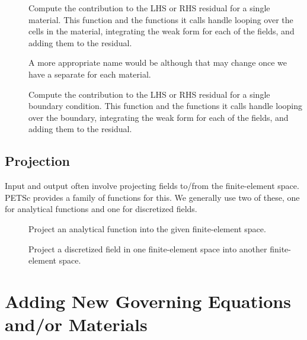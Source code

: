 \begin{description}
\item[] Compute the
  contribution to the LHS or RHS residual for a single material. This
  function and the functions it calls handle looping over the cells in
  the material, integrating the weak form for each of the fields, and
  adding them to the residual.

  A more appropriate name would be
   although that may change once
  we have a separate  for each material.
%
\item[] Compute the contribution
  to the LHS or RHS residual for a single boundary condition. This
  function and the functions it calls handle looping over the
  boundary, integrating the weak form for each of the fields, and
  adding them to the residual.
\end{description}

\subsection{Projection}

Input and output often involve projecting fields to/from the
finite-element space. PETSc provides a family of functions for
this. We generally use two of these, one for analytical functions and
one for discretized fields.


\begin{description}
\item[] Project an analytical function
  into the given finite-element space.
\item[] Project a discretized field in one
  finite-element space into another finite-element space.
\end{description}


\section{Adding New Governing Equations and/or Materials}

